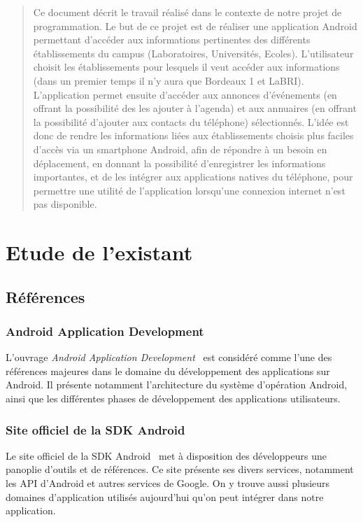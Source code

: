 \documentclass [pdftex,12pt] {report}
\begin{document}


\newpage

\begin{abstract}
Ce document décrit le travail réalisé dans le contexte de notre projet de programmation. Le but de ce projet est de réaliser une application Android permettant d'accéder aux informations pertinentes des différents établissements du campus (Laboratoires, Universités, Ecoles). L'utilisateur choisit les établissements pour lesquels il veut accéder aux informations (dans un premier temps il n'y aura que Bordeaux 1 et LaBRI). L'application permet ensuite d'accéder aux annonces d'événements (en offrant la possibilité des les ajouter à l'agenda) et aux annuaires (en offrant la possibilité d'ajouter aux contacts du téléphone) sélectionnés.
L'idée est donc de rendre les informations liées aux établissements choisis plus faciles d'accès via un smartphone Android, afin de répondre à un besoin en déplacement, en donnant la possibilité d'enregistrer les informations importantes, et de les intégrer aux applications natives du téléphone, pour permettre une utilité de l'application lorsqu'une connexion internet n'est pas disponible.
\end{abstract}


\vspace{2cm}
\tableofcontents
\newpage 

\chapter{Etude de l'existant}
\section{Références}


\subsection{Android Application Development}
L'ouvrage \emph{Android Application Development}~\cite{AndroidBook} est considéré comme l'une des références majeures dans le domaine du développement des applications sur Android.
Il présente notamment l'architecture du système d'opération Android, ainsi que les différentes phases de développement des applications utilisateurs.

\subsection{Site officiel de la SDK Android}
Le site officiel de la SDK Android~\cite{AndroidSDK} met à disposition des développeurs une panoplie d'outils et de références.
Ce site présente ses divers services, notamment les API d'Android et autres services de Google. On y trouve aussi plusieurs domaines d'application utilisés aujourd'hui qu'on peut intégrer dans notre application.
\end{document}
